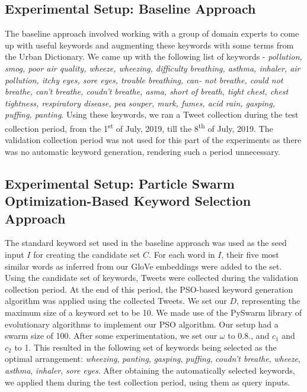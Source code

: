 \documentclass[runningheads]{llncs}
\begin{document}
\subsection{Experimental Setup: Baseline Approach}
The baseline approach involved working with a group of domain experts to come up with useful keywords and augmenting these keywords with some terms from the Urban Dictionary. We came up with the following list of keywords - \textit{pollution, smog, poor air quality, wheeze, wheezing, difficulty breathing, asthma, inhaler, air pollution, itchy eyes, sore eyes, trouble breathing, can- not breathe, could not breathe, can’t breathe, coudn’t breathe, asma, short of breath, tight chest, chest tightness, respiratory disease, pea souper, murk, fumes, acid rain, gasping, puffing, panting}. Using these keywords, we ran a Tweet collection during the test collection period, from the 1\textsuperscript{st} of July, 2019, till the 8\textsuperscript{th} of July, 2019. The validation collection period was not used for this part of the experiments as there was no automatic keyword generation, rendering such a period unnecessary.

\subsection{Experimental Setup: Particle Swarm Optimization-Based Keyword Selection Approach}
The standard keyword set used in the baseline approach was used as the seed input $I$ for creating the candidate set $C$. For each word in $I$, their five most similar words as inferred from our GloVe embeddings were added to the set. Using the candidate set of keywords, Tweets were collected during the validation collection period. At the end of this period, the PSO-based keyword generation algorithm was applied using the collected Tweets. We set our $D$, representing the maximum size of a keyword set to be 10. We made use of the PySwarm library of evolutionary algorithms to implement our PSO algorithm. Our setup had a swarm size of 100. After some experimentation, we set our $\omega$ to 0.8., and $c_1$ and $c_2$ to 1. This resulted in the following set of keywords being selected as the optimal arrangement: \textit{wheezing}, \textit{panting}, \textit{gasping}, \textit{puffing}, \textit{coudn't breathe}, \textit{wheeze}, \textit{asthma}, \textit{inhaler}, \textit{sore eyes}.
After obtaining the automatically selected keywords, we applied them during the test collection period, using them as query inputs.
\end{document}
